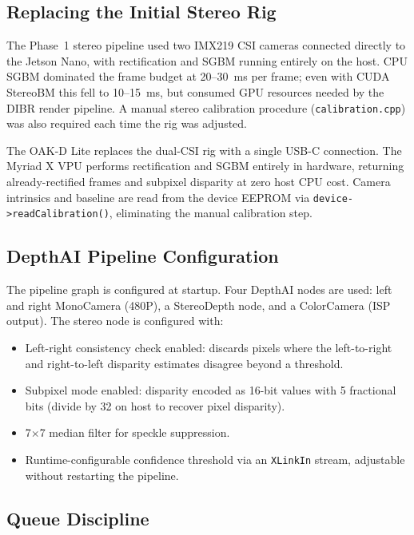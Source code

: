 \documentclass[11pt, a4paper]{report}
\begin{document}
\subsection{Replacing the Initial Stereo Rig}

The Phase~1 stereo pipeline used two IMX219 CSI cameras connected
directly to the Jetson Nano, with rectification and SGBM running
entirely on the host.
CPU SGBM dominated the frame budget at 20--30~ms per frame; even with
CUDA StereoBM this fell to 10--15~ms, but consumed GPU resources needed
by the DIBR render pipeline.
A manual stereo calibration procedure (\texttt{calibration.cpp}) was
also required each time the rig was adjusted.

The OAK-D Lite replaces the dual-CSI rig with a single USB-C connection.
The Myriad X VPU performs rectification and SGBM entirely in hardware,
returning already-rectified frames and subpixel disparity at zero host
CPU cost.
Camera intrinsics and baseline are read from the device EEPROM via
\texttt{device->readCalibration()}, eliminating the manual calibration
step.

\subsection{DepthAI Pipeline Configuration}

The pipeline graph is configured at startup.
Four DepthAI nodes are used: left and right MonoCamera (480P), a
StereoDepth node, and a ColorCamera (ISP output).
The stereo node is configured with:

\begin{itemize}[noitemsep]
    \item Left-right consistency check enabled: discards pixels where
          the left-to-right and right-to-left disparity estimates disagree
          beyond a threshold.
    \item Subpixel mode enabled: disparity encoded as 16-bit values with
          5 fractional bits (divide by 32 on host to recover pixel disparity).
    \item 7$\times$7 median filter for speckle suppression.
    \item Runtime-configurable confidence threshold via an \texttt{XLinkIn}
          stream, adjustable without restarting the pipeline.
\end{itemize}

\subsection{Queue Discipline}
\end{document}

